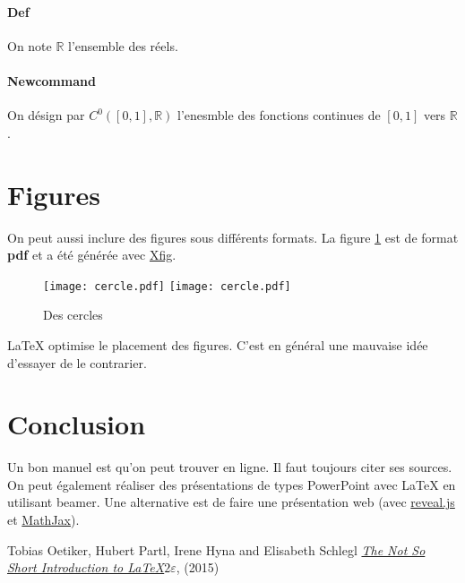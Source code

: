 \documentclass{article}
\def \R {\mathbb R}					%
\newcommand \fonctionsContinues[2] {C^0(#1,#2)}		%
\begin{document}
\paragraph{Def} On note $\R$ l'ensemble des r\'eels.
\paragraph{Newcommand} On d\'esign par $\fonctionsContinues{[0,1]}{\R}$ l'enesmble des fonctions continues de $[0,1]$ vers $\R$.

\section{Figures}
On peut aussi inclure des figures sous diff\'erents formats. La figure \ref{cercle} est de format \textbf{pdf}  et a \'et\'e g\'en\'er\'ee avec \href{xwww.xfig.org}{Xfig}.
\begin{figure}
\begin{center}
\texttt{[image: cercle.pdf]}
\texttt{[image: cercle.pdf]}
\caption{Des cercles}\label{cercle}
\end{center}
\end{figure}
{\LaTeX} optimise le placement des figures. C'est en g\'en\'eral une mauvaise id\'ee d'essayer de le contrarier.
\section{Conclusion}
Un bon manuel
est \cite{NotSoShort} qu'on peut trouver en ligne. Il faut toujours citer ses sources.
On peut \'egalement r\'ealiser des pr\'esentations de types PowerPoint avec {\LaTeX} en utilisant beamer.
Une alternative est de faire une présentation web (avec \href{http://lab.hakim.se/reveal-js/}{reveal.js} et \href{https://www.mathjax.org/}{MathJax}).

\begin{thebibliography}{99}
 Tobias Oetiker, Hubert Partl, Irene Hyna and Elisabeth Schlegl
\href{https://tobi.oetiker.ch/lshort/lshort.pdf}{\emph{The Not So Short
Introduction to \LaTeX $2\varepsilon$}},
 (2015)
\end{thebibliography}
\end{document}
